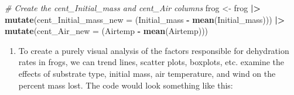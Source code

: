 \documentclass[
  10t,
]{article}
\newenvironment{Shaded}{\begin{snugshade}}{\end{snugshade}}
\newcommand{\AttributeTok}[1]{\textcolor[rgb]{0.13,0.29,0.53}{#1}}
\newcommand{\CommentTok}[1]{\textcolor[rgb]{0.56,0.35,0.01}{\textit{#1}}}
\newcommand{\FunctionTok}[1]{\textcolor[rgb]{0.13,0.29,0.53}{\textbf{#1}}}
\newcommand{\NormalTok}[1]{#1}
\newcommand{\OtherTok}[1]{\textcolor[rgb]{0.56,0.35,0.01}{#1}}
\newcommand{\SpecialCharTok}[1]{\textcolor[rgb]{0.81,0.36,0.00}{\textbf{#1}}}
\providecommand{\tightlist}{%
  \setlength{\itemsep}{0pt}\setlength{\parskip}{0pt}}
\begin{document}
\begin{Shaded}
\begin{Highlighting}[]
\CommentTok{\# Create the cent\_Initial\_mass and cent\_Air columns}
\NormalTok{frog }\OtherTok{\textless{}{-}}\NormalTok{ frog }\SpecialCharTok{|\textgreater{}}
  \FunctionTok{mutate}\NormalTok{(}\AttributeTok{cent\_Initial\_mass\_new =}\NormalTok{ (Initial\_mass }\SpecialCharTok{{-}} \FunctionTok{mean}\NormalTok{(Initial\_mass))) }\SpecialCharTok{|\textgreater{}}
  \FunctionTok{mutate}\NormalTok{(}\AttributeTok{cent\_Air\_new =}\NormalTok{ (Airtemp }\SpecialCharTok{{-}} \FunctionTok{mean}\NormalTok{(Airtemp)))}
\end{Highlighting}
\end{Shaded}

\begin{enumerate}
\def\labelenumi{\alph{enumi}.}
\setcounter{enumi}{3}
\tightlist
\item
  To create a purely visual analysis of the factors responsible for
  dehydration rates in frogs, we can trend lines, scatter plots,
  boxplots, etc. examine the effects of substrate type, initial mass,
  air temperature, and wind on the percent mass lost. The code would
  look something like this:
\end{enumerate}
\end{document}
